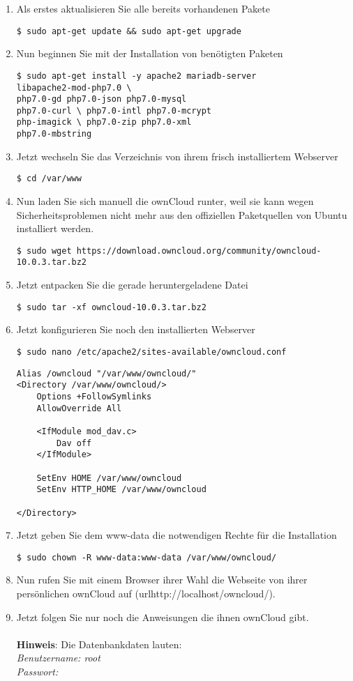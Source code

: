 \begin{enumerate}
	\item Als erstes aktualisieren Sie alle bereits vorhandenen Pakete
	\begin{lstlisting}
$ sudo apt-get update && sudo apt-get upgrade
	\end{lstlisting}
	\item Nun beginnen Sie mit der Installation von benötigten Paketen
	\begin{lstlisting}
$ sudo apt-get install -y apache2 mariadb-server 
libapache2-mod-php7.0 \
php7.0-gd php7.0-json php7.0-mysql 
php7.0-curl \ php7.0-intl php7.0-mcrypt 
php-imagick \ php7.0-zip php7.0-xml 
php7.0-mbstring
	\end{lstlisting}
	\item Jetzt wechseln Sie das Verzeichnis von ihrem frisch installiertem Webserver
	\begin{lstlisting}
$ cd /var/www
	\end{lstlisting}
	\item Nun laden Sie sich manuell die ownCloud runter, weil sie kann wegen Sicherheitsproblemen nicht mehr aus den offiziellen Paketquellen von Ubuntu installiert werden.
	\begin{lstlisting}
$ sudo wget https://download.owncloud.org/community/owncloud-10.0.3.tar.bz2
	\end{lstlisting}
	\item Jetzt entpacken Sie die gerade heruntergeladene Datei
	\begin{lstlisting}
$ sudo tar -xf owncloud-10.0.3.tar.bz2
	\end{lstlisting}
	\item Jetzt konfigurieren Sie noch den installierten Webserver
	\begin{lstlisting}
$ sudo nano /etc/apache2/sites-available/owncloud.conf
	\end{lstlisting}
	\begin{lstlisting}
Alias /owncloud "/var/www/owncloud/"
<Directory /var/www/owncloud/>
  	Options +FollowSymlinks
  	AllowOverride All

 	<IfModule mod_dav.c>
  		Dav off
 	</IfModule>

 	SetEnv HOME /var/www/owncloud
 	SetEnv HTTP_HOME /var/www/owncloud

</Directory>
	\end{lstlisting}
	\item Jetzt geben Sie dem www-data die notwendigen Rechte für die Installation
	\begin{lstlisting}
$ sudo chown -R www-data:www-data /var/www/owncloud/
	\end{lstlisting}
	\item Nun rufen Sie mit einem Browser ihrer Wahl die Webseite von ihrer persönlichen ownCloud auf (url{http://localhost/owncloud/}).
	\item Jetzt folgen Sie nur noch die Anweisungen die ihnen ownCloud gibt. \\\\
	\textbf{Hinweis}: Die Datenbankdaten lauten: \\ 
			\textit{Benutzername: root \\ 
			Passwort:}
\end{enumerate}


